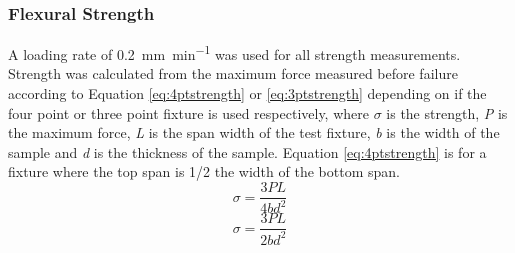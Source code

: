     \subsubsection{Flexural Strength}
        A loading rate of \SI{0.2}{mm\per\minute} was used for all strength measurements.
        Strength was calculated from the maximum force measured before failure according to Equation \ref{eq:4ptstrength} or \ref{eq:3ptstrength} depending on if the four point or three point fixture is used respectively, where $\sigma{}$ is the strength, \textit{P} is the maximum force, \textit{L} is the span width of the test fixture, \textit{b} is the width of the sample and \textit{d} is the thickness of the sample. Equation \ref{eq:4ptstrength} is for a fixture where the top span is 1/2 the width of the bottom span.\cite{ASTM2008}
        \begin{equation}
            \sigma = \frac{3PL}{4bd^{2}}
            \label{eq:4ptstrength}
        \end{equation}
        \begin{equation}
            \sigma = \frac{3PL}{2bd^{2}}
            \label{eq:3ptstrength}
        \end{equation}

